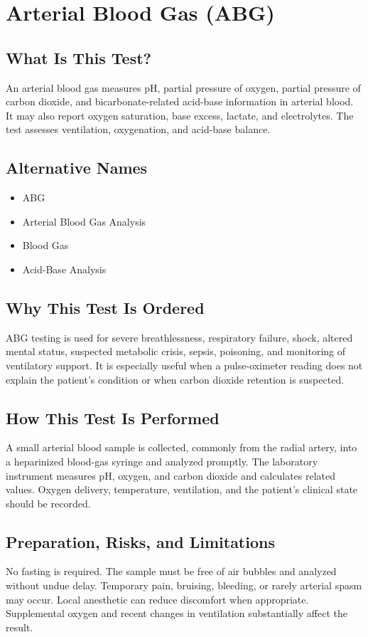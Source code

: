 \chapter{Arterial Blood Gas (ABG)}

\section*{What Is This Test?}
An arterial blood gas measures pH, partial pressure of oxygen, partial pressure of carbon dioxide, and bicarbonate-related acid-base information in arterial blood. It may also report oxygen saturation, base excess, lactate, and electrolytes. The test assesses ventilation, oxygenation, and acid-base balance.

\section*{Alternative Names}
\begin{itemize}
  \item ABG
  \item Arterial Blood Gas Analysis
  \item Blood Gas
  \item Acid-Base Analysis
\end{itemize}
\section*{Why This Test Is Ordered}
ABG testing is used for severe breathlessness, respiratory failure, shock, altered mental status, suspected metabolic crisis, sepsis, poisoning, and monitoring of ventilatory support. It is especially useful when a pulse-oximeter reading does not explain the patient's condition or when carbon dioxide retention is suspected.

\section*{How This Test Is Performed}
A small arterial blood sample is collected, commonly from the radial artery, into a heparinized blood-gas syringe and analyzed promptly. The laboratory instrument measures pH, oxygen, and carbon dioxide and calculates related values. Oxygen delivery, temperature, ventilation, and the patient's clinical state should be recorded.

\section*{Preparation, Risks, and Limitations}
No fasting is required. The sample must be free of air bubbles and analyzed without undue delay. Temporary pain, bruising, bleeding, or rarely arterial spasm may occur. Local anesthetic can reduce discomfort when appropriate. Supplemental oxygen and recent changes in ventilation substantially affect the result.

